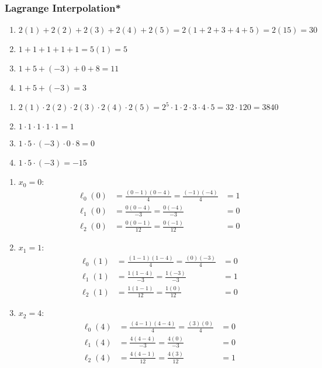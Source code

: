 \subsubsection{Lagrange Interpolation*}
\begin{answer}
    \renewcommand{\labelenumi}{(\alph{enumi})}
    \begin{enumerate}
        \item $2(1) + 2(2) + 2(3) + 2(4) + 2(5) = 2(1+2+3+4+5) = 2(15) = 30$
        \item $1+1+1+1+1 = 5(1) = 5$
        \item $1+5+(-3)+0+8 = 11$
        \item $1+5+(-3)=3$
    \end{enumerate}
\end{answer}

\begin{answer}
    \renewcommand{\labelenumi}{(\alph{enumi})}
    \begin{enumerate}
        \item $2(1) \cdot 2(2) \cdot 2(3) \cdot 2(4) \cdot 2(5) = 2^5\cdot1\cdot2\cdot3\cdot4\cdot5 
        = 32\cdot120 = 3840$
        \item $1\cdot1\cdot1\cdot1\cdot1 = 1$
        \item $1\cdot5\cdot(-3)\cdot0\cdot8 = 0$
        \item $1\cdot5\cdot(-3) = -15$
    \end{enumerate}
\end{answer}

\begin{answer}
    \renewcommand{\labelenumi}{(\alph{enumi})}
    \begin{enumerate}
        \item $x_0 = 0$:
        \begin{align*}
            \ell_0(0) &= \frac{(0-1)(0-4)}{4} = \frac{(-1)(-4)}{4} &= 1\\
            \ell_1(0) &= \frac{0(0-4)}{-3} = \frac{0(-4)}{-3} &= 0\\
            \ell_2(0) &= \frac{0(0-1)}{12} = \frac{0(-1)}{12} &= 0
        \end{align*}
        \item $x_1 = 1$:
        \begin{align*}
            \ell_0(1) &= \frac{(1-1)(1-4)}{4} = \frac{(0)(-3)}{4} &= 0\\
            \ell_1(1) &= \frac{1(1-4)}{-3} = \frac{1(-3)}{-3} &= 1\\
            \ell_2(1) &= \frac{1(1-1)}{12} = \frac{1(0)}{12} &= 0
        \end{align*}
        \item $x_2 = 4$:
        \begin{align*}
            \ell_0(4) &= \frac{(4-1)(4-4)}{4} = \frac{(3)(0)}{4} &= 0\\
            \ell_1(4) &= \frac{4(4-4)}{-3} = \frac{4(0)}{-3} &= 0\\
            \ell_2(4) &= \frac{4(4-1)}{12} = \frac{4(3)}{12} &= 1
        \end{align*}
    \end{enumerate}
\end{answer}

